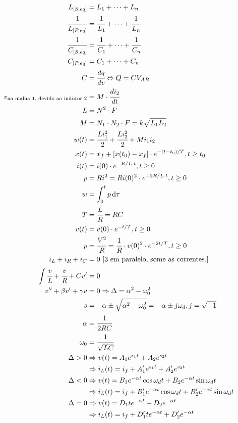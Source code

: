 \documentclass[12pt,a4paper]{article}
\begin{document}
\begin{align}
L_{[S,eq]} &= L_1 + \cdots + L_n \\
\cfrac{1}{L_{[P,eq]}} &= \cfrac{1}{L_1} + \cdots + \cfrac{1}{L_n} \\
\cfrac{1}{C_{[S,eq]}} &= \cfrac{1}{C_1} + \cdots + \cfrac{1}{C_n} \\
C_{[P,eq]} &= C_1 + \cdots + C_n \\
C &= \cfrac{dq}{dv} \Leftrightarrow Q = CV_{AB} \\
v_{\text{na malha 1, devido ao indutor 2}} &= M\cdot \cfrac{di_2}{dt} \\
L &= N^2\cdot F \\
M &= N_1 \cdot N_2 \cdot F = k \sqrt{L_1 L_2} \\
w(t) &= \cfrac{Li_1^2}{2} + \cfrac{Li_2^2}{2} + M i_1 i_2 \\
x(t) &= x_f + [x(t_0) - x_f] \cdot e^{-(t - t_0)/T}, t \ge t_0 \\
i(t) &= i(0)\cdot e^{-R/L\cdot t}, t \ge 0 \\
p &= Ri^2 = R i(0)^2\cdot e^{-2R/L\cdot t}, t \ge 0 \\
w &= \int_0^t p\,\mathrm{d}\tau \\
T &= \cfrac{L}{R} = RC \\
v(t) &= v(0)\cdot e^{-t/T}, t \ge 0 \\
p &= \cfrac{V^2}{R} = \cfrac{1}{R}\cdot v(0)^2\cdot e^{-2t/T}, t \ge 0 \\
i_L + i_R + i_C &= 0 \text{ [3 em paralelo, some as correntes.]} \\
\int \cfrac{v}{L} + \cfrac{v}{R} + Cv' &= 0 \\
v'' + \beta v' + \gamma v &= 0 \Rightarrow \Delta = \alpha^2 - \omega_0^2 \\
s &= -\alpha \pm \sqrt{\alpha^2 - \omega_0^2} = - \alpha \pm j \omega_d, j = \sqrt{-1} \\
\alpha &= \cfrac{1}{2RC} \\
\omega_0 &= \cfrac{1}{\sqrt{LC}} \\
\Delta > 0 &\Rightarrow v(t) = A_1 e^{s_1 t} + A_2 e^{s_2 t} \\
&\Rightarrow i_L(t) = i_f + A_1' e^{s_1 t} + A_2' e^{s_2 t} \\
\Delta < 0 &\Rightarrow v(t) = B_1 e^{- \alpha t} \cos \omega_d t + B_2 e^{-\alpha t} \sin \omega_d t \\
&\Rightarrow i_L(t) = i_f + B_1' e^{- \alpha t} \cos \omega_d t + B_2' e^{-\alpha t} \sin \omega_d t \\
\Delta = 0 &\Rightarrow v(t) = D_1 t e^{-\alpha t} + D_2 e^{-\alpha t} \\
&\Rightarrow i_L(t) = i_f + D_1' t e^{-\alpha t} + D_2' e^{-\alpha t}
\end{align}
\end{document}
